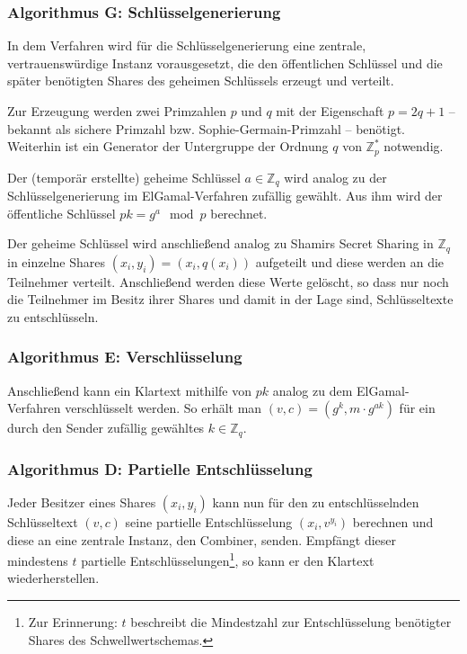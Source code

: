\subsubsection*{Algorithmus G: Schlüsselgenerierung}

In dem Verfahren wird für die Schlüsselgenerierung eine zentrale, vertrauenswürdige Instanz vorausgesetzt, die den öffentlichen Schlüssel und die später benötigten Shares des geheimen Schlüssels erzeugt und verteilt. 

Zur Erzeugung werden zwei Primzahlen \(p\) und \(q\) mit der Eigenschaft \(p = 2q + 1\) -- bekannt als sichere Primzahl bzw. Sophie-Germain-Primzahl -- benötigt. Weiterhin ist ein Generator der Untergruppe der Ordnung \(q\) von \(\mathbb{Z}_p^*\) notwendig.

Der (temporär erstellte) geheime Schlüssel \(a \in \mathbb{Z}_q\) wird analog zu der Schlüsselgenerierung im ElGamal-Verfahren zufällig gewählt. Aus ihm wird der öffentliche Schlüssel \(pk = g^a \mod p\) berechnet.

Der geheime Schlüssel wird anschließend analog zu Shamirs Secret Sharing in \(\mathbb{Z}_q\) in einzelne Shares \((x_i, y_i) = (x_i, q(x_i))\) aufgeteilt und diese werden an die Teilnehmer verteilt. Anschließend werden diese Werte gelöscht, so dass nur noch die Teilnehmer im Besitz ihrer Shares und damit in der Lage sind, Schlüsseltexte zu entschlüsseln.

\subsubsection*{Algorithmus E: Verschlüsselung}

Anschließend kann ein Klartext mithilfe von \(pk\) analog zu dem ElGamal-Verfahren 
verschlüsselt werden. So erhält man \((v,c) = (g^k, m \cdot g^{ak})\) für ein durch den Sender zufällig gewähltes \(k \in \mathbb{Z}_q\).

\subsubsection*{Algorithmus D: Partielle Entschlüsselung}

Jeder Besitzer eines Shares \((x_i, y_i)\) kann nun für den zu entschlüsselnden Schlüsseltext \((v,c)\) seine partielle Entschlüsselung \((x_i, v^{y_i})\) berechnen und diese an eine zentrale Instanz, den Combiner, senden. Empfängt dieser mindestens \(t\) partielle Entschlüsselungen\footnote{
  Zur Erinnerung: \(t\) beschreibt die Mindestzahl zur Entschlüsselung benötigter Shares des Schwellwertschemas.
}, so kann er den Klartext wiederherstellen.

